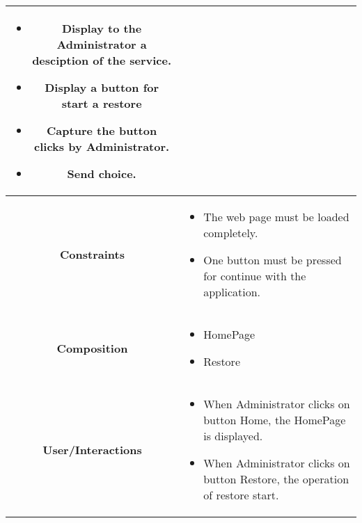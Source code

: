 \documentclass[11pt, a4paper,titlepage]{article}
\begin{document}
\begin{enumerate}
\begin{tabularx}{\textwidth}{| c | X |}
\begin{itemize}
		\item Display to the Administrator a desciption of the service.
		\item Display a button for start a restore
		\item Capture the button clicks by Administrator.
		\item Send choice.
	\end{itemize}
	\\
	\hline
	\textbf{Constraints} &
	\begin{itemize}
		\item  The web page must be loaded completely.
		\item One button must be pressed for continue with the application.
	\end{itemize}
	\\
	\hline
	\textbf{Composition} &
	\begin{itemize}
		\item HomePage
		\item Restore
	\end{itemize}
	\\
	\hline
	\textbf{User/Interactions} &
	\begin{itemize}
		\item When Administrator clicks on button Home, the HomePage is displayed.
		\item When Administrator clicks on button Restore, the operation of restore start.
	\end{itemize}
	\\
	\hline 
\end{tabularx}


\end{enumerate}
\end{document}
